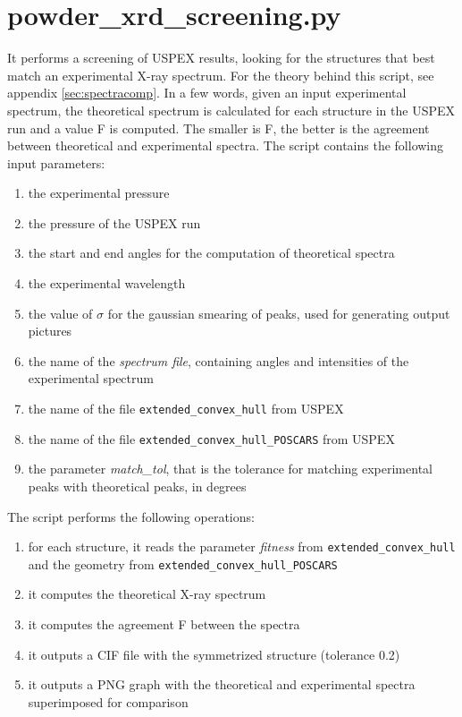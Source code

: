 \documentclass{article}
\begin{document}
\section{powder\_xrd\_screening.py}
It performs a screening of USPEX results, looking for the structures that best match an experimental X-ray spectrum. For the theory behind this script, see appendix \ref{sec:spectracomp}. In a few words, given an input experimental spectrum, the theoretical spectrum is calculated for each structure in the USPEX run and a value F is computed. The smaller is F, the better is the agreement between theoretical and experimental spectra. The script contains the following input parameters:
\begin{enumerate}
	\item the experimental pressure
	\item the pressure of the USPEX run
	\item the start and end angles for the computation of theoretical spectra
	\item the experimental wavelength
	\item the value of $\sigma$ for the gaussian smearing of peaks, used for generating output pictures
	\item the name of the \emph{spectrum file}, containing angles and intensities of the experimental spectrum
	\item the name of the file \texttt{extended\_convex\_hull} from USPEX
	\item the name of the file \texttt{extended\_convex\_hull\_POSCARS} from USPEX
	\item the parameter \emph{match\_tol}, that is the tolerance for matching experimental peaks with theoretical peaks, in degrees
\end{enumerate}
The script performs the following operations:
\begin{enumerate}
	\item for each structure, it reads the parameter \emph{fitness} from \texttt{extended\_convex\_hull} and the geometry from \texttt{extended\_convex\_hull\_POSCARS}
	\item it computes the theoretical X-ray spectrum
	\item it computes the agreement F between the spectra
	\item it outputs a CIF file with the symmetrized structure (tolerance 0.2)
	\item it outputs a PNG graph with the theoretical and experimental spectra superimposed for comparison
\end{enumerate}
\end{document}
